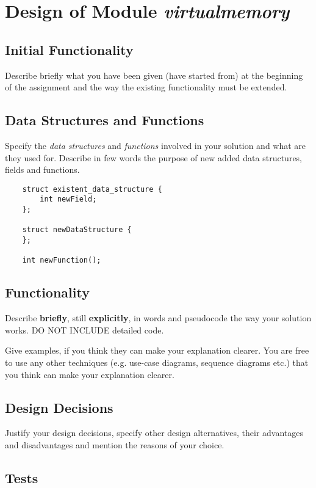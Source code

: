 
\chapter{Design of Module \textit{virtualmemory}}


\section{Initial Functionality}

Describe briefly what you have been given (have started from) at the beginning of the assignment and the way the existing functionality must be extended.

\section{Data Structures and Functions}

Specify the \textit{data structures} and \textit{functions} involved in your solution and what are they used for. Describe in few words the purpose of new added data structures, fields and functions. 

\begin{lstlisting}
	struct existent_data_structure {
		int newField;
	};
	
	struct newDataStructure {
	};
	
	int newFunction();
\end{lstlisting}


\section{Functionality}

Describe \textbf{briefly}, still \textbf{explicitly}, in words and pseudocode the way your solution works. DO NOT INCLUDE detailed code. 

Give examples, if you think they can make your explanation clearer. You are free to use any other techniques (e.g. use-case diagrams, sequence diagrams etc.) that you think can make your explanation clearer. 


\section{Design Decisions}

Justify your design decisions, specify other design alternatives, their advantages and disadvantages and mention the reasons of your choice.  

\section{Tests}

